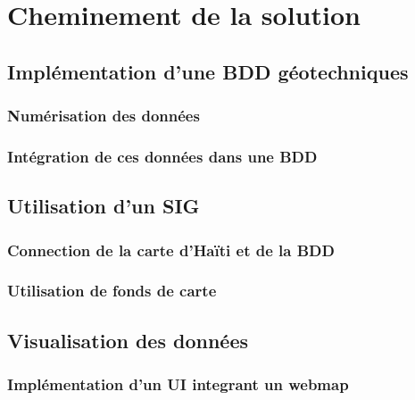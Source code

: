 \section{Cheminement de la solution}
    \subsection{Implémentation d'une BDD géotechniques}
        \subsubsection{Numérisation des données}
            
        \subsubsection{Intégration de ces données dans une BDD}
            
    \subsection{Utilisation d'un SIG}
        \subsubsection{Connection de la carte d'Haïti et de la BDD}
            
        \subsubsection{Utilisation de fonds de carte}
            
    \subsection{Visualisation des données} 
        \subsubsection{Implémentation d'un UI integrant un webmap}
            
